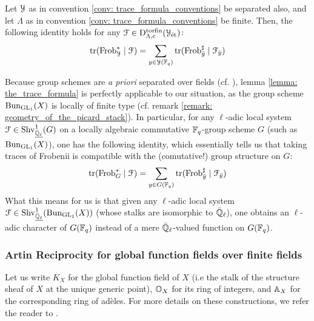             \begin{lemma} \label{lemma: the_trace_formula}
                \cite[\href{https://stacks.math.columbia.edu/tag/03UG}{Tag 03UG}]{stacks} Let $\mathcal{Y}$ as in convention \ref{conv: trace_formula_conventions} be separated also, and let $\Lambda$ as in convention \ref{conv: trace_formula_conventions} be finite. Then, the following identity holds for any $\mathcal{F} \in \mathrm{D}_{\Lambda, \mathrm{c}}^{\mathrm{tor}\mathrm{fin}}(\mathcal{Y}_{\mathrm{\acute{e}t}})$:
                    $$\operatorname{tr}(\mathrm{Frob}_{\mathcal{Y}}^* \mid \mathcal{F}) = \sum_{y \in \mathcal{Y}(\mathbb{F}_q)} \operatorname{tr}(\mathrm{Frob}_{\bar{y}}^{\sharp} \mid \mathcal{F}_{\bar{y}})$$
            \end{lemma}
            \begin{corollary} \label{coro: the_trace_formula_for_locally_algebraic_groups}
                Because group schemes are \textit{a priori} separated over fields (cf. \cite[\href{https://stacks.math.columbia.edu/tag/047L}{Tag 047L}]{stacks}), lemma \ref{lemma: the_trace_formula} is perfectly applicable to our situation, as the group scheme $\mathrm{Bun}_{\operatorname{GL}_1}(X)$ is locally of finite type (cf. remark \ref{remark: geometry_of_the_picard_stack}). In particular, for any $\ell$-adic local system $\mathcal{F} \in \mathrm{Shv}_{\underline{\bar{\mathbb{Q}}_{\ell}}}^1(G)$ on a locally algebraic commutative $\mathbb{F}_q$-group scheme $G$ (such as $\mathrm{Bun}_{\operatorname{GL}_1}(X)$), one has the following identity, which essentially tells us that taking traces of Frobenii is compatible with the (comutative!) group structure on $G$:
                    $$\operatorname{tr}(\mathrm{Frob}_G^* \mid \mathcal{F}) = \sum_{y \in G(\mathbb{F}_q)} \operatorname{tr}(\mathrm{Frob}_{\bar{y}}^{\sharp} \mid \mathcal{F}_{\bar{y}})$$
                What this means for us is that given any $\ell$-adic local system $\mathcal{F} \in \mathrm{Shv}_{\underline{\bar{\mathbb{Q}}_{\ell}}}^1(\mathrm{Bun}_{\operatorname{GL}_1}(X))$ (whose stalks are isomorphic to $\bar{\mathbb{Q}}_{\ell}$), one obtains an $\ell$-adic character of $G(\mathbb{F}_q)$ instead of a mere $\bar{\mathbb{Q}}_{\ell}$-valued function on $G(\mathbb{F}_q)$.
            \end{corollary}
        
        \subsubsection{Artin Reciprocity for global function fields over finite fields}
            \begin{convention} \label{conv: global_function_field}
                Let us write $K_X$ for the global function field of $X$ (i.e the stalk of the structure sheaf of $X$ at the unique generic point), $\mathbb{O}_X$ for its ring of integers, and $\mathbb{A}_X$ for the corresponding ring of ad\`eles. For more details on these constructions, we refer the reader to \cite[Section VI.1]{neukirch_2010_algebraic_number_theory}. 
            \end{convention}
            
